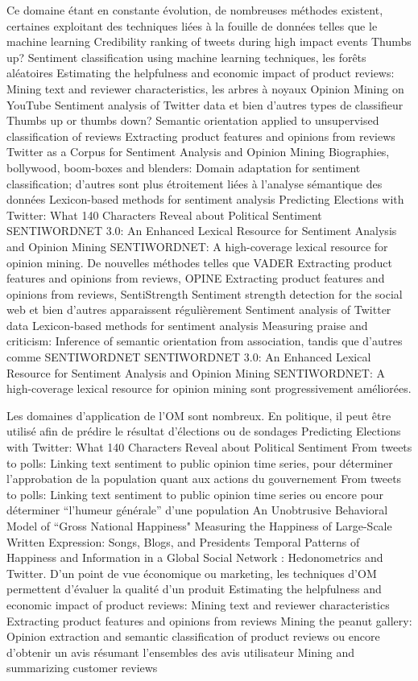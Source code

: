 \documentclass[8pt]{article}
\begin{document}
\begin{multicols}{2}
\par Ce domaine étant en constante évolution, de nombreuses méthodes existent, certaines exploitant des techniques liées à la fouille de données telles que le machine learning {Credibility ranking of tweets during high impact events} {Thumbs up? Sentiment classification using machine learning techniques}, les forêts aléatoires {Estimating the helpfulness and economic impact of product reviews: Mining text and reviewer characteristics}, les arbres à noyaux {Opinion Mining on YouTube} {Sentiment analysis of Twitter data} et bien d’autres types de classifieur {Thumbs up or thumbs down? Semantic orientation applied to unsupervised classification of reviews} {Extracting product features and opinions from reviews} {Twitter as a Corpus for Sentiment Analysis and Opinion Mining} {Biographies, bollywood, boom-boxes and blenders: Domain adaptation for sentiment classification}; d’autres sont plus étroitement liées à l’analyse sémantique des données {Lexicon-based methods for sentiment analysis} {Predicting Elections with Twitter: What 140 Characters Reveal about Political Sentiment} {SENTIWORDNET 3.0: An Enhanced Lexical Resource for Sentiment Analysis and Opinion Mining} {SENTIWORDNET: A high-coverage lexical resource for opinion mining}.
De nouvelles méthodes telles que VADER {Extracting product features and opinions from reviews}, OPINE {Extracting product features and opinions from reviews}, SentiStrength {Sentiment strength detection for the social web} et bien d’autres apparaissent régulièrement {Sentiment analysis of Twitter data} {Lexicon-based methods for sentiment analysis} {Measuring praise and criticism: Inference of semantic orientation from association}, tandis que d’autres comme SENTIWORDNET {SENTIWORDNET 3.0: An Enhanced Lexical Resource for Sentiment Analysis and Opinion Mining} {SENTIWORDNET: A high-coverage lexical resource for opinion mining} sont progressivement améliorées.

Les domaines d’application de l’OM sont nombreux. En politique, il peut être utilisé afin de prédire le résultat d'élections ou de sondages {Predicting Elections with Twitter: What 140 Characters Reveal about Political Sentiment} {From tweets to polls: Linking text sentiment to public opinion time series}, pour déterminer l’approbation de la population quant aux actions du gouvernement {From tweets to polls: Linking text sentiment to public opinion time series} ou encore pour déterminer “l’humeur générale” d’une population {An Unobtrusive Behavioral Model of “Gross National Happiness"} {Measuring the Happiness of Large-Scale Written Expression: Songs, Blogs, and Presidents} {Temporal Patterns of Happiness and Information in a Global Social Network : Hedonometrics and Twitter}.
D’un point de vue économique ou marketing, les techniques d’OM permettent d’évaluer la qualité d’un produit {Estimating the helpfulness and economic impact of product reviews: Mining text and reviewer characteristics} {Extracting product features and opinions from reviews} {Mining the peanut gallery: Opinion extraction and semantic classification of product reviews} ou encore d’obtenir un avis résumant l’ensembles des avis utilisateur {Mining and summarizing customer reviews}


\end{multicols}
\end{document}
